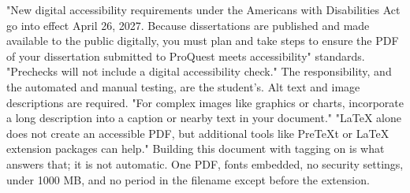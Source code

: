 %


\thesisrequiretagging
\thesisrequiredocumentlanguage
{}
	{"New digital accessibility requirements under the Americans with
	 Disabilities Act go into effect April 26, 2027. Because dissertations are
	 published and made available to the public digitally, you must plan and
	 take steps to ensure the PDF of your dissertation submitted to ProQuest
	 meets accessibility" standards.}
	{"Prechecks will not include a digital accessibility check." The
	 responsibility, and the automated and manual testing, are the student's.}
	{Alt text and image descriptions are required. "For complex images like
	 graphics or charts, incorporate a long description into a caption or nearby
	 text in your document."}
	{"LaTeX alone does not create an accessible PDF, but additional tools like
	 PreTeXt or LaTeX extension packages can help." Building this document with
	 tagging on is what answers that; it is not automatic.}
	{One PDF, fonts embedded, no security settings, under 1000 MB, and no period
	 in the filename except before the extension.}

\thesisnoapprovalpage
